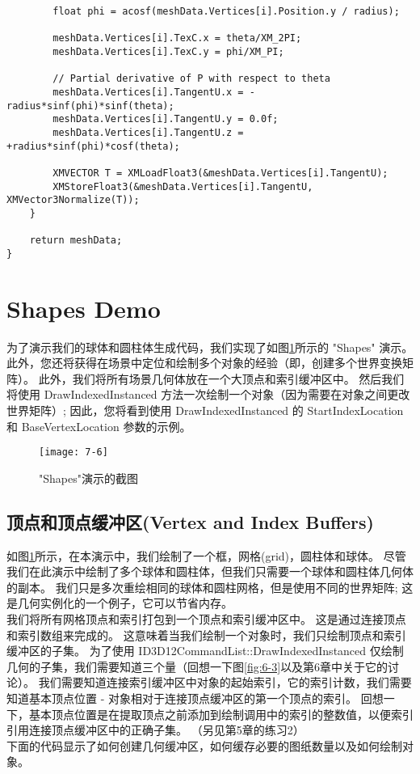 \begin{lstlisting}
        float phi = acosf(meshData.Vertices[i].Position.y / radius);

        meshData.Vertices[i].TexC.x = theta/XM_2PI;
        meshData.Vertices[i].TexC.y = phi/XM_PI;

        // Partial derivative of P with respect to theta
        meshData.Vertices[i].TangentU.x = -radius*sinf(phi)*sinf(theta);
        meshData.Vertices[i].TangentU.y = 0.0f;
        meshData.Vertices[i].TangentU.z = +radius*sinf(phi)*cosf(theta);

        XMVECTOR T = XMLoadFloat3(&meshData.Vertices[i].TangentU);
        XMStoreFloat3(&meshData.Vertices[i].TangentU, XMVector3Normalize(T));
    }

    return meshData;
}
\end{lstlisting}

\section{Shapes Demo}
\begin{flushleft}
为了演示我们的球体和圆柱体生成代码，我们实现了如图\ref{fig:7-6}所示的 "Shapes" 演示。 此外，您还将获得在场景中定位和绘制多个对象的经验（即，创建多个世界变换矩阵）。 此外，我们将所有场景几何体放在一个大顶点和索引缓冲区中。 然后我们将使用 DrawIndexedInstanced 方法一次绘制一个对象（因为需要在对象之间更改世界矩阵）; 因此，您将看到使用 DrawIndexedInstanced 的 StartIndexLocation 和 BaseVertexLocation 参数的示例。\\
\end{flushleft}

\begin{figure}[h]
    \texttt{[image: 7-6]}
    \centering
    \caption{"Shapes"演示的截图}
    \label{fig:7-6}
\end{figure}

\subsection{顶点和顶点缓冲区(Vertex and Index Buffers)}
\begin{flushleft}
如图\ref{fig:7-6}所示，在本演示中，我们绘制了一个框，网格(grid)，圆柱体和球体。 尽管我们在此演示中绘制了多个球体和圆柱体，但我们只需要一个球体和圆柱体几何体的副本。 我们只是多次重绘相同的球体和圆柱网格，但是使用不同的世界矩阵; 这是几何实例化的一个例子，它可以节省内存。\\
我们将所有网格顶点和索引打包到一个顶点和索引缓冲区中。 这是通过连接顶点和索引数组来完成的。 这意味着当我们绘制一个对象时，我们只绘制顶点和索引缓冲区的子集。 为了使用 ID3D12CommandList::DrawIndexedInstanced 仅绘制几何的子集，我们需要知道三个量（回想一下图\ref{fig:6-3}以及第6章中关于它的讨论）。 我们需要知道连接索引缓冲区中对象的起始索引，它的索引计数，我们需要知道基本顶点位置 - 对象相对于连接顶点缓冲区的第一个顶点的索引。 回想一下，基本顶点位置是在提取顶点之前添加到绘制调用中的索引的整数值，以便索引引用连接顶点缓冲区中的正确子集。 （另见第5章的练习2）\\

下面的代码显示了如何创建几何缓冲区，如何缓存必要的图纸数量以及如何绘制对象。
\end{flushleft}

